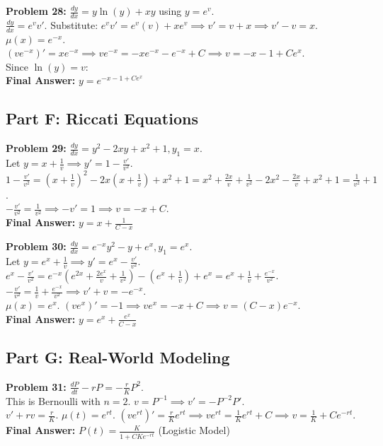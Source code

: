 \documentclass[12pt]{article}
\begin{document}
\vspace{10pt}
\textbf{Problem 28:} $\frac{dy}{dx} = y \ln(y) + x y$ using $y = e^v$. \\
$\frac{dy}{dx} = e^v v'$. Substitute: $e^v v' = e^v (v) + x e^v \implies v' = v + x \implies v' - v = x$. \\
$\mu(x) = e^{-x}$. $(ve^{-x})' = x e^{-x} \implies ve^{-x} = -xe^{-x} - e^{-x} + C \implies v = -x-1 + Ce^x$. \\
Since $\ln(y) = v$: \\
\textbf{Final Answer:} $y = e^{-x - 1 + Ce^x}$

\subsection*{Part F: Riccati Equations}

\textbf{Problem 29:} $\frac{dy}{dx} = y^2 - 2xy + x^2 + 1, y_1 = x$. \\
Let $y = x + \frac{1}{v} \implies y' = 1 - \frac{v'}{v^2}$. \\
$1 - \frac{v'}{v^2} = \left(x + \frac{1}{v}\right)^2 - 2x\left(x + \frac{1}{v}\right) + x^2 + 1 = x^2 + \frac{2x}{v} + \frac{1}{v^2} - 2x^2 - \frac{2x}{v} + x^2 + 1 = \frac{1}{v^2} + 1$. \\
$-\frac{v'}{v^2} = \frac{1}{v^2} \implies -v' = 1 \implies v = -x + C$. \\
\textbf{Final Answer:} $y = x + \frac{1}{C - x}$

\vspace{10pt}
\textbf{Problem 30:} $\frac{dy}{dx} = e^{-x} y^2 - y + e^x, y_1 = e^x$. \\
Let $y = e^x + \frac{1}{v} \implies y' = e^x - \frac{v'}{v^2}$. \\
$e^x - \frac{v'}{v^2} = e^{-x}\left(e^{2x} + \frac{2e^x}{v} + \frac{1}{v^2}\right) - \left(e^x + \frac{1}{v}\right) + e^x = e^x + \frac{1}{v} + \frac{e^{-x}}{v^2}$. \\
$-\frac{v'}{v^2} = \frac{1}{v} + \frac{e^{-x}}{v^2} \implies v' + v = -e^{-x}$. \\
$\mu(x) = e^x$. $(ve^x)' = -1 \implies ve^x = -x + C \implies v = (C-x)e^{-x}$. \\
\textbf{Final Answer:} $y = e^x + \frac{e^x}{C-x}$

\subsection*{Part G: Real-World Modeling}

\textbf{Problem 31:} $\frac{dP}{dt} - rP = -\frac{r}{K}P^2$. \\
This is Bernoulli with $n=2$. $v=P^{-1} \implies v' = -P^{-2}P'$. \\
$v' + rv = \frac{r}{K}$. $\mu(t) = e^{rt}$. $(ve^{rt})' = \frac{r}{K}e^{rt} \implies ve^{rt} = \frac{1}{K}e^{rt} + C \implies v = \frac{1}{K} + Ce^{-rt}$. \\
\textbf{Final Answer:} $P(t) = \frac{K}{1 + C K e^{-rt}}$ (Logistic Model)
\end{document}
